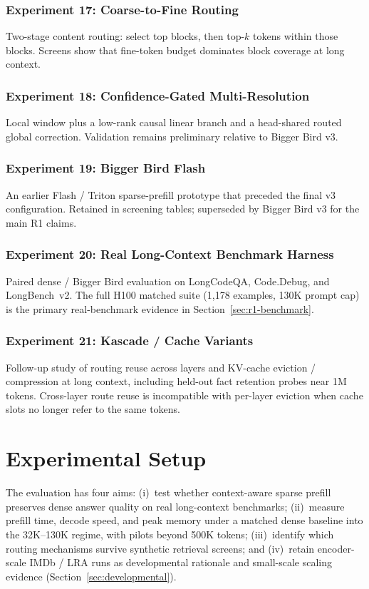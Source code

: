 \documentclass[11pt]{article}
\begin{document}
\subsubsection*{Experiment 17: Coarse-to-Fine Routing}
Two-stage content routing: select top blocks, then top-$k$ tokens within
those blocks. Screens show that fine-token budget dominates block coverage at
long context.

\subsubsection*{Experiment 18: Confidence-Gated Multi-Resolution}
Local window plus a low-rank causal linear branch and a head-shared routed
global correction. Validation remains preliminary relative to Bigger Bird v3.

\subsubsection*{Experiment 19: Bigger Bird Flash}
An earlier Flash / Triton sparse-prefill prototype that preceded the final
v3 configuration. Retained in screening tables; superseded by Bigger Bird v3
for the main R1 claims.


\subsubsection*{Experiment 20: Real Long-Context Benchmark Harness}
Paired dense / Bigger Bird evaluation on LongCodeQA, Code.Debug, and
LongBench~v2. The full H100 matched suite (1{,}178 examples, 130K prompt cap)
is the primary real-benchmark evidence in Section~\ref{sec:r1-benchmark}.

\subsubsection*{Experiment 21: Kascade / Cache Variants}
Follow-up study of routing reuse across layers and KV-cache eviction /
compression at long context, including held-out fact retention probes near
1M tokens. Cross-layer route reuse is incompatible with per-layer eviction
when cache slots no longer refer to the same tokens.


\section{Experimental Setup}
\label{sec:setup}
\label{sec:dataset}

The evaluation has four aims: (i)~test whether context-aware sparse prefill
preserves dense answer quality on real long-context benchmarks;
(ii)~measure prefill time, decode speed, and peak memory under a matched dense
baseline into the 32K--130K regime, with pilots beyond 500K tokens;
(iii)~identify which routing mechanisms survive synthetic retrieval screens;
and (iv)~retain encoder-scale IMDb / LRA runs as developmental rationale and
small-scale scaling evidence
(Section~\ref{sec:developmental}).
\end{document}
